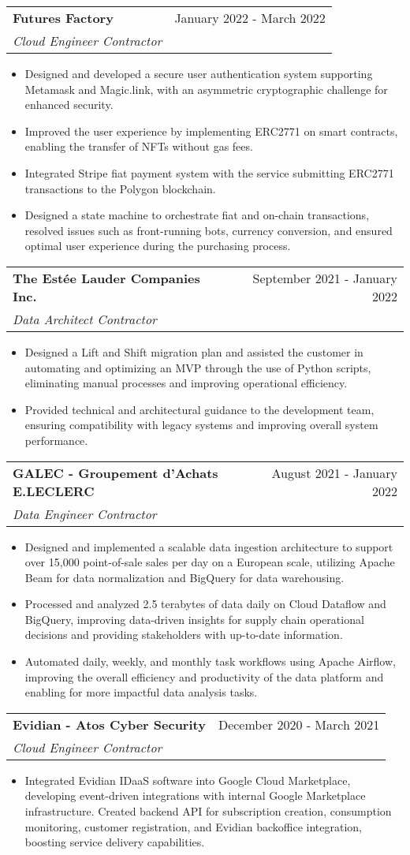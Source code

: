 \documentclass[letterpaper,11pt]{article}
\makeatletter
\newcommand{\resumeItem}[1]{
  \item\small{#1 \vspace{-2pt}}
}
\newcommand{\resumeSubheading}[3]{
  \vspace{-1pt}\item
    \begin{tabular*}{0.97\textwidth}[t]{l@{\extracolsep{\fill}}r}
      \textbf{#1} & #2 \\
      \textit{\small #3} \\
    \end{tabular*}\vspace{-5pt}
}
\newcommand{\resumeItemListStart}{\begin{itemize}}
\newcommand{\resumeItemListEnd}{\end{itemize}\vspace{-5pt}}
\makeatother
\begin{document}
\resumeSubheading{Futures Factory}
{January 2022 - March 2022}
{Cloud Engineer Contractor}
\resumeItemListStart{}
\resumeItem{
	Designed and developed a secure user authentication system supporting Metamask
	and Magic.link, with an asymmetric cryptographic challenge for enhanced
	security.
}
\resumeItem{
	Improved the user experience by implementing ERC2771 on smart contracts,
	enabling the transfer of NFTs without gas fees.
}
\resumeItem{
	Integrated Stripe fiat payment system with the service submitting ERC2771
	transactions to the Polygon blockchain.
}
\resumeItem{
	Designed a state machine to orchestrate fiat and on-chain transactions, resolved
	issues such as front-running bots, currency conversion, and ensured optimal user
	experience during the purchasing process.
}
\resumeItemListEnd{}


\resumeSubheading{The Estée Lauder Companies Inc.}
{September 2021 - January 2022}
{Data Architect Contractor}
\resumeItemListStart{}
\resumeItem{
	Designed a Lift and Shift migration plan and assisted the customer in automating
	and optimizing an MVP through the use of Python scripts, eliminating manual
	processes and improving operational efficiency.
}
\resumeItem{
	Provided technical and architectural guidance to the development team, ensuring
	compatibility with legacy systems and improving overall system performance.
}
\resumeItemListEnd{}


\resumeSubheading{GALEC - Groupement d'Achats E.LECLERC}
{August 2021 - January 2022}
{Data Engineer Contractor}
\resumeItemListStart{}
\resumeItem{
	Designed and implemented a scalable data ingestion architecture to support over
	15,000 point-of-sale sales per day on a European scale, utilizing Apache Beam
	for data normalization and BigQuery for data warehousing.
}
\resumeItem{
	Processed and analyzed 2.5 terabytes of data daily on Cloud Dataflow and
	BigQuery, improving data-driven insights for supply chain operational decisions
	and providing stakeholders with up-to-date information.
}
\resumeItem{
	Automated daily, weekly, and monthly task workflows using Apache Airflow,
	improving the overall efficiency and productivity of the data platform and
	enabling for more impactful data analysis tasks.
}
\resumeItemListEnd{}


\resumeSubheading{Evidian - Atos Cyber Security}
{December 2020 - March 2021}
{Cloud Engineer Contractor}
\resumeItemListStart{}
\resumeItem{
	Integrated Evidian IDaaS software into Google Cloud Marketplace, developing
	event-driven integrations with internal Google Marketplace infrastructure.
	Created backend API for subscription creation, consumption monitoring, customer
	registration, and Evidian backoffice integration, boosting service delivery
	capabilities.
}
\resumeItemListEnd{}
\end{document}
